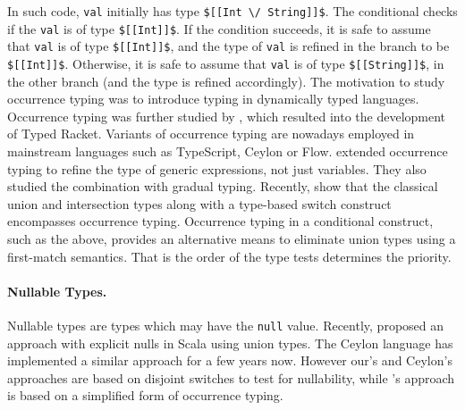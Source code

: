 \noindent In such code, \lstinline{val} initially has type \lstinline{$[[Int \/ String]]$}.
The conditional checks if the \lstinline{val} is of type \lstinline{$[[Int]]$}.
If the condition succeeds, it is safe to assume that \lstinline{val} is of type \lstinline{$[[Int]]$},
and the type of \lstinline{val} is refined in the branch to be \lstinline{$[[Int]]$}.
Otherwise, it is safe to assume that \lstinline{val} is of type \lstinline{$[[String]]$}, in the
other branch (and the type is refined accordingly).
The motivation to study occurrence typing was to introduce typing in dynamically
typed languages.
Occurrence typing was further studied by \cite{tobin2010logical},
which resulted into the development of Typed Racket.
Variants of occurrence typing are nowadays employed in mainstream languages
such as TypeScript, Ceylon or Flow.
\cite{castagna2019revisiting} extended occurrence typing to refine the type of
generic expressions, not just variables. They also studied the combination
with gradual typing. Recently, \cite{castagna2022type} show that the
classical union and intersection types along with a type-based
switch construct encompasses occurrence typing.
Occurrence typing in a conditional construct,
such as the above, provides an alternative
means to eliminate union types using a first-match semantics. That is the
order of the type tests determines the priority.

\paragraph*{Nullable Types.}
Nullable types are types which may have the \lstinline{null} value.
Recently, \cite{nieto20nulls} proposed an
approach with explicit nulls in Scala using union types. The Ceylon
language has implemented a similar approach for a few years now.
However our's and Ceylon's approaches are based on disjoint switches to test
for nullability, while \cite{nieto20nulls}'s approach is based
on a simplified form of occurrence typing.

